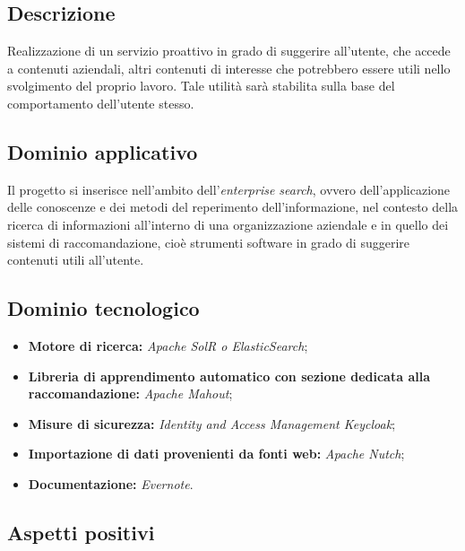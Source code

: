 \documentclass[openany,12pt,a4paper]{report}
\begin{document}
	\subsection{Descrizione}
	
	Realizzazione di un servizio proattivo in grado di suggerire all’utente, che accede a contenuti aziendali, altri contenuti di interesse che potrebbero essere utili nello svolgimento del proprio lavoro. Tale utilità sarà stabilita sulla base del comportamento dell’utente stesso.
	
	\subsection{Dominio applicativo}
	
	Il progetto si inserisce nell'ambito dell'\textit{enterprise search}, ovvero dell’applicazione delle conoscenze e dei metodi del reperimento dell’informazione, nel contesto della ricerca di informazioni all’interno di una organizzazione aziendale e in quello dei sistemi di raccomandazione, cioè strumenti software in grado di suggerire contenuti utili all’utente.
	
	\subsection{Dominio tecnologico}
	
	\begin{itemize}
		\item \textbf{Motore di ricerca:} \textit{Apache SolR o ElasticSearch};
		
		\item \textbf{Libreria di apprendimento automatico con sezione dedicata alla raccomandazione:} \textit{Apache Mahout};
		
		\item \textbf{Misure di sicurezza:} \textit{Identity and Access Management Keycloak};
		
		\item \textbf{Importazione di dati provenienti da fonti web:} \textit{Apache Nutch};
		
		\item \textbf{Documentazione:} \textit{Evernote}.
	\end{itemize}
	
	\subsection{Aspetti positivi}
	
\end{document}
